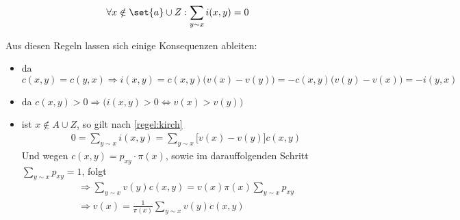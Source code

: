 \begin{regel}
	\label{regel:kirch}
	\begin{align}
		\forall x \notin \set{a} \cup Z: \sum\limits_{y \sim x} i(x,y) = 0
	\end{align}
\end{regel}

Aus diesen Regeln lassen sich einige Konsequenzen ableiten:
\begin{itemize}
	\item da $c(x,y) = c(y,x) \Rightarrow i(x,y) = c(x,y)\big(v(x) -v(y)\big) = -c(x,y)\big(v(y)- v(x)\big) = - i(y,x)$
	\item da $c(x,y) > 0 \Rightarrow \Big({i(x,y) > 0 \Leftrightarrow v(x) > v(y)}\Big)$
	\item ist $x \notin A \cup Z$, so gilt nach \ref{regel:kirch} 
		\begin{align}
			0 = \sum\limits_{y \sim x} i(x,y) = \sum\limits_{y \sim x} \big[v(x)-v(y)\big]c(x,y)
		\end{align}
		Und wegen $c(x,y) = p_{xy} \cdot \pi(x)$, sowie im darauffolgenden Schritt $\sum\limits_{y \sim x} p_{xy} = 1$, folgt
		\begin{align}
			\Rightarrow \sum\limits_{y\sim x} v(y)c(x,y) = v(x)\pi(x) \sum\limits_{y \sim x} p_{xy} \\
			\Rightarrow v(x) = \frac{1}{\pi(x)} \sum\limits_{y \sim x} v(y) c(x,y)
		\end{align}
\end{itemize}



\newpage




